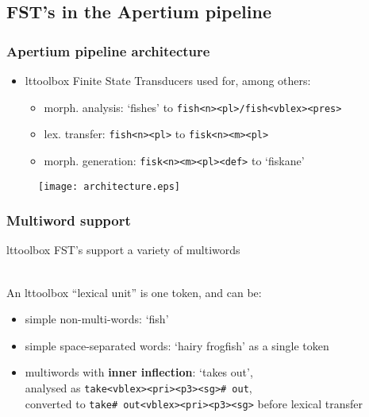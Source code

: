 \documentclass[notes=hide]{beamer}
\newcommand{\ana}[1]{\texttt{#1}}
\newcommand{\form}[1]{`#1'}
\begin{document}
\subsection{FST's in the Apertium pipeline}
\begin{frame}
  \frametitle{Apertium pipeline architecture}
  \begin{itemize}
    \item lttoolbox Finite State Transducers used for, among others:
      \begin{itemize}
      \item morph. analysis: \form{fishes} to \ana{fish<n><pl>/fish<vblex><pres>}
      \item lex. transfer: \ana{fish<n><pl>} to \ana{fisk<n><m><pl>}
      \item morph. generation: \ana{fisk<n><m><pl><def>} to \form{fiskane}
      \end{itemize}
  \end{itemize}
  \begin{figure}[h]
    \begin{center}
      \texttt{[image: architecture.eps]}
      \label{fig:architecture}
    \end{center}
  \end{figure}
\end{frame}

\begin{frame}
  \frametitle{Multiword support}
  lttoolbox FST's support a variety of multiwords

  ~ \\

  An lttoolbox ``lexical unit'' is one token, and can be:
  \begin{itemize}
  \item simple non-multi-words: \form{fish}
  \item simple space-separated words: \form{hairy frogfish} as a
    single token
  \item multiwords with \textbf{inner inflection}: \form{takes out}, \\
    analysed as \ana{take<vblex><pri><p3><sg>\# out},\\
    converted to \ana{take\# out<vblex><pri><p3><sg>} before lexical
    transfer
  \end{itemize}
\end{frame}
\end{document}
